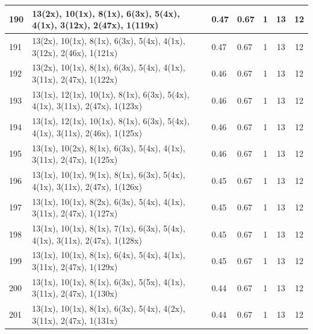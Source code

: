 \begin{small}
\begin{longtable}{|p{0.5cm}|p{9cm}|p{1.3cm}|p{1.3cm}|c|c|c|}
  190 & 13(2x), 10(1x), 8(1x), 6(3x), 5(4x), 4(1x), 3(12x), 2(47x), 1(119x) & \cellcolor{colorGood}  0.47 & \cellcolor{colorGood} 0.67 & 1 & 13 & \cellcolor{colorGood} 12 \\   \hline
  191 & 13(2x), 10(1x), 8(1x), 6(3x), 5(4x), 4(1x), 3(12x), 2(46x), 1(121x) & \cellcolor{colorGood}  0.47 & \cellcolor{colorGood} 0.67 & 1 & 13 & \cellcolor{colorGood} 12 \\   \hline
  192 & 13(2x), 10(1x), 8(1x), 6(3x), 5(4x), 4(1x), 3(11x), 2(47x), 1(122x) & \cellcolor{colorGood}  0.46 & \cellcolor{colorGood} 0.67 & 1 & 13 & \cellcolor{colorGood} 12 \\   \hline
  193 & 13(1x), 12(1x), 10(1x), 8(1x), 6(3x), 5(4x), 4(1x), 3(11x), 2(47x), 1(123x) & \cellcolor{colorGood}  0.46 & \cellcolor{colorGood} 0.67 & 1 & 13 & \cellcolor{colorGood} 12 \\   \hline
  194 & 13(1x), 12(1x), 10(1x), 8(1x), 6(3x), 5(4x), 4(1x), 3(11x), 2(46x), 1(125x) & \cellcolor{colorGood}  0.46 & \cellcolor{colorGood} 0.67 & 1 & 13 & \cellcolor{colorGood} 12 \\   \hline
  195 & 13(1x), 10(2x), 8(1x), 6(3x), 5(4x), 4(1x), 3(11x), 2(47x), 1(125x) & \cellcolor{colorGood}  0.46 & \cellcolor{colorGood} 0.67 & 1 & 13 & \cellcolor{colorGood} 12 \\   \hline
  196 & 13(1x), 10(1x), 9(1x), 8(1x), 6(3x), 5(4x), 4(1x), 3(11x), 2(47x), 1(126x) & \cellcolor{colorGood}  0.45 & \cellcolor{colorGood} 0.67 & 1 & 13 & \cellcolor{colorGood} 12 \\   \hline
  197 & 13(1x), 10(1x), 8(2x), 6(3x), 5(4x), 4(1x), 3(11x), 2(47x), 1(127x) & \cellcolor{colorGood}  0.45 & \cellcolor{colorGood} 0.67 & 1 & 13 & \cellcolor{colorGood} 12 \\   \hline
  198 & 13(1x), 10(1x), 8(1x), 7(1x), 6(3x), 5(4x), 4(1x), 3(11x), 2(47x), 1(128x) & \cellcolor{colorGood}  0.45 & \cellcolor{colorGood} 0.67 & 1 & 13 & \cellcolor{colorGood} 12 \\   \hline
  199 & 13(1x), 10(1x), 8(1x), 6(4x), 5(4x), 4(1x), 3(11x), 2(47x), 1(129x) & \cellcolor{colorGood}  0.45 & \cellcolor{colorGood} 0.67 & 1 & 13 & \cellcolor{colorGood} 12 \\   \hline
  200 & 13(1x), 10(1x), 8(1x), 6(3x), 5(5x), 4(1x), 3(11x), 2(47x), 1(130x) & \cellcolor{colorGood}  0.44 & \cellcolor{colorGood} 0.67 & 1 & 13 & \cellcolor{colorGood} 12 \\   \hline
  201 & 13(1x), 10(1x), 8(1x), 6(3x), 5(4x), 4(2x), 3(11x), 2(47x), 1(131x) & \cellcolor{colorGood}  0.44 & \cellcolor{colorGood} 0.67 & 1 & 13 & \cellcolor{colorGood} 12 \\   \hline

\end{longtable}
\end{small}
